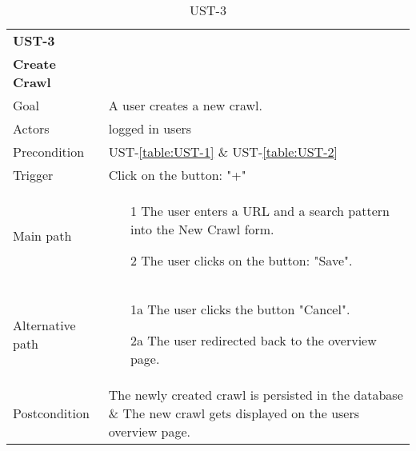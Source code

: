 \documentclass[titlepage, 12pt]{article}
\begin{document}
\begin{table}[H]
    \begin{center}
  
      \begin{tabular}{p{4cm}|p{10cm}}
        \textbf{UST-3}\\ \textbf{Create Crawl}                                            \\
        \hline
        Goal             & A user creates a new crawl.                  \\
        \hline
        Actors           & logged in users                                               \\
        \hline
        Precondition     & UST-\ref{table:UST-1} \& UST-\ref{table:UST-2}                \\
        \hline
        Trigger          & Click on the button: "+"                                   \\
        \hline
        Main path        &
        \begin{itemize}
          \item [1] The user enters a URL and a search pattern into the New Crawl form.
          \item [2] The user clicks on the button: "Save".
        \end{itemize}                                                         \\
        \hline
        Alternative path &
        \begin{itemize}
          \item [1a] The user clicks the button "Cancel".
          \item [2a] The user redirected back to the overview page.
        \end{itemize}                                                         \\
        \hline
        Postcondition    & The newly created crawl is persisted in the database \& The new crawl gets displayed on the users overview page. \\
      \end{tabular}
  
      \caption{UST-3}
      \label{table:UST-3}
  
    \end{center}
  \end{table}
\end{document}
